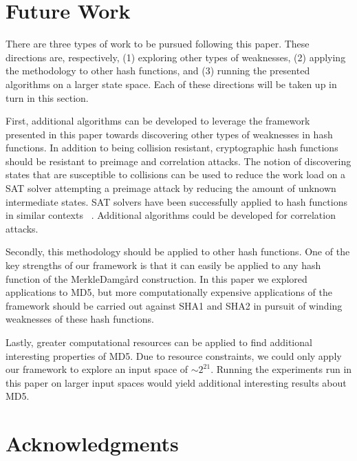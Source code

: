 \section{Future Work}

There are three types of work to be pursued following this paper. These directions are, respectively, (1) exploring other types of weaknesses, (2) applying the methodology to other hash functions, and (3) running the presented algorithms on a larger state space. Each of these directions will be taken up in turn in this section. 

First, additional algorithms can be developed to leverage the framework presented in this paper towards discovering other types of weaknesses in hash functions. In addition to being collision resistant, cryptographic hash functions should be resistant to preimage and correlation attacks. The notion of discovering states that are susceptible to collisions can be used to reduce the work load on a SAT solver attempting a preimage attack by reducing the amount of unknown intermediate states. SAT solvers have been successfully applied to hash functions in similar contexts ~\cite{mironov2006applications}. Additional algorithms could be developed for correlation attacks. 

Secondly, this methodology should be applied to other hash functions. One of the key strengths of our framework is that it can easily be applied to any hash function of the Merkle{\textendash}Damg\r{a}rd construction. In this paper we explored applications to MD5, but more computationally expensive applications of the framework should be carried out against SHA1 and SHA2 in pursuit of winding weaknesses of these hash functions. 

Lastly, greater computational resources can be applied to find additional interesting properties of MD5. Due to resource constraints, we could only apply our framework to explore an input space of  $\sim 2^{21}$. Running the experiments run in this paper on larger input spaces would yield additional interesting results about MD5. 

\section*{Acknowledgments}

